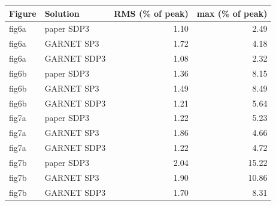 \begin{tabular}{llrr}
\hline
Figure & Solution & RMS (\% of peak) & max (\% of peak) \\
\hline
fig6a & paper SDP3 & 1.10 & 2.49 \\
fig6a & GARNET SP3 & 1.72 & 4.18 \\
fig6a & GARNET SDP3 & 1.08 & 2.32 \\
fig6b & paper SDP3 & 1.36 & 8.15 \\
fig6b & GARNET SP3 & 1.49 & 8.49 \\
fig6b & GARNET SDP3 & 1.21 & 5.64 \\
fig7a & paper SDP3 & 1.22 & 5.23 \\
fig7a & GARNET SP3 & 1.86 & 4.66 \\
fig7a & GARNET SDP3 & 1.22 & 4.72 \\
fig7b & paper SDP3 & 2.04 & 15.22 \\
fig7b & GARNET SP3 & 1.90 & 10.86 \\
fig7b & GARNET SDP3 & 1.70 & 8.31 \\
\hline
\end{tabular}
